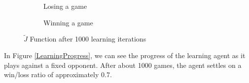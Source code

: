 \documentclass[11pt]{article}
\begin{document}
\begin{figure}[htbp]
  \begin{subfigure}{0.45\textwidth}
    \centering
    \caption{Losing a game}
    \label{fig:learned_j_lost}
  \end{subfigure}
  \hspace{1em}
  \begin{subfigure}{0.45\textwidth}
    \centering
    \caption{Winning a game}
    \label{fig:learned_j_win}
  \end{subfigure}
  \caption{$\tilde{J}$ Function after 1000 learning iterations}
  \label{fig:learned_j}
\end{figure}

In Figure \ref{LearningProgress}, we can see the progress of the learning
agent as it plays against a fixed opponent. After about 1000 games, the agent
settles on a win/loss ratio of approximately 0.7. 
\end{document}
